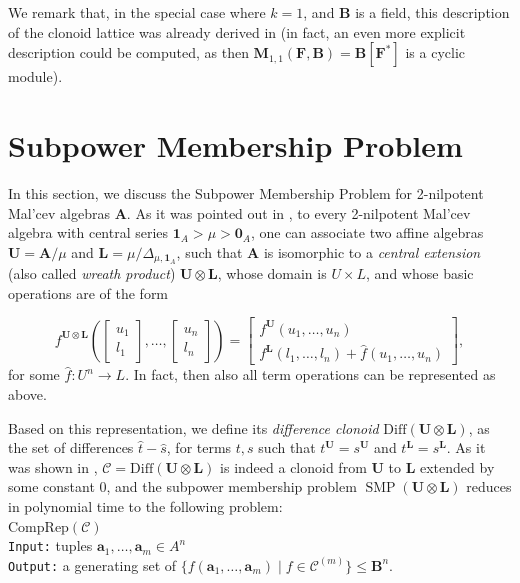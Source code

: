 \documentclass[11pt]{amsart}
\theoremstyle{plain}
\theoremstyle{definition}
\newcommand{\F}{{\mathbf F}}
\newcommand{\alg}[1]{\mathbf{#1}}
\newcommand{\clonoid}[1]{\mathcal{#1}}
\newcommand{\clodC}{\clonoid{C}}
\newcommand{\algA}{\alg{A}}
\newcommand{\algB}{\alg{B}}
\newcommand{\algL}{\alg{L}}
\newcommand{\algM}{\alg{M}}
\newcommand{\algU}{\alg{U}}
\renewcommand\vec{\mathbf}
\newcommand{\va}{\vec{a}}
\DeclareMathOperator{\SMP}{SMP}
\begin{document}
We remark that, in the special case where $k = 1$, and $\algB$ is a field, this description of the clonoid lattice was already derived in \cite{fioravanti-clonoids} (in fact, an even more explicit description could be computed, as then $\algM_{1,1}(\F,\algB) = \algB[\F^*]$ is a cyclic module).

\section{Subpower Membership Problem} \label{sect:SMP}

In this section, we discuss the Subpower Membership Problem for 2-nilpotent Mal'cev algebras $\algA$. As it was pointed out in \cite[Chapter 7]{FM-commutators}, to every 2-nilpotent Mal'cev algebra with central series $\mathbf 1_A > \mu > \mathbf 0_A$, one can associate two affine algebras $\algU = \algA/\mu$ and $\algL = \mu /\Delta_{\mu,\mathbf 1_A}$, such that $\algA$ is isomorphic to a \emph{central extension} (also called \emph{wreath product}) $\algU \otimes \algL$, whose domain is $U\times L$, and whose basic operations are of the form

$$f^{\algU \otimes \algL}\left( \begin{bmatrix} u_1\\ l_1 \end{bmatrix}, \ldots, \begin{bmatrix} u_n\\ l_n \end{bmatrix} \right) = \begin{bmatrix} f^{\algU}(u_1,\ldots,u_n)\\ f^{\algL}(l_1,\ldots,l_n) + \hat f(u_1,\ldots,u_n) \end{bmatrix},$$
for some $\hat f \colon U^n \to L$. In fact, then also all term operations can be represented as above.

Based on this representation, we define its \emph{difference clonoid} $\mathrm{Diff}(\algU \otimes \algL)$, as the set of differences $\hat t - \hat s$, for terms $t,s$ such that $t^\algU = s^{\algU}$ and $t^\algL = s^{\algL}$. As it was shown in \cite{kompatscher-SMP2nil}, $\clodC = \mathrm{Diff}(\algU \otimes \algL)$ is indeed a clonoid from $\algU$ to $\algL$ extended by some constant $0$, and  the subpower membership problem $\SMP(\algU \otimes \algL)$ reduces in polynomial time to the following problem:\\

{\noindent $\mathrm{CompRep}(\clodC)$}\\
\texttt{Input:} tuples $\va_1,\ldots,\va_m\in A^n$\\
\texttt{Output:} a generating set of $\{f(\va_1,\ldots,\va_m) \mid f \in \clodC^{(m)} \} \leq \algB^n$.\\
\end{document}

